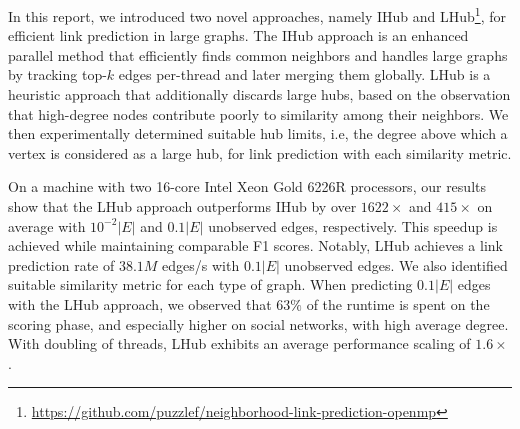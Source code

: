 In this report, we introduced two novel approaches, namely IHub and LHub\footnote{\url{https://github.com/puzzlef/neighborhood-link-prediction-openmp}}, for efficient link prediction in large graphs. The IHub approach is an enhanced parallel method that efficiently finds common neighbors and handles large graphs by tracking top-$k$ edges per-thread and later merging them globally. LHub is a heuristic approach that additionally discards large hubs, based on the observation that high-degree nodes contribute poorly to similarity among their neighbors. We then experimentally determined suitable hub limits, i.e, the degree above which a vertex is considered as a large hub, for link prediction with each similarity metric.

On a machine with two 16-core Intel Xeon Gold 6226R processors, our results show that the LHub approach outperforms IHub by over $1622\times$ and $415\times$ on average with $10^{-2}|E|$ and $0.1|E|$ unobserved edges, respectively. This speedup is achieved while maintaining comparable F1 scores. Notably, LHub achieves a link prediction rate of $38.1M$ edges/s with $0.1|E|$ unobserved edges. We also identified suitable similarity metric for each type of graph. When predicting $0.1|E|$ edges with the LHub approach, we observed that $63\%$ of the runtime is spent on the scoring phase, and especially higher on social networks, with high average degree. With doubling of threads, LHub exhibits an average performance scaling of $1.6\times$.







